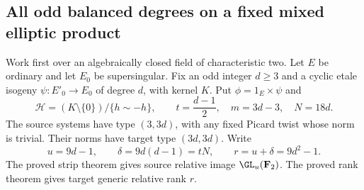 \subsection{All odd balanced degrees on a fixed mixed elliptic product}
\label{subsec:mixed-all-odd-norm-candidate}

Work first over an algebraically closed field of characteristic two.
Let $E$ be ordinary and let $E_0$ be supersingular. Fix an odd integer
$d\geq3$ and a cyclic etale isogeny
$\psi:E'_0\longrightarrow E_0$ of degree $d$, with kernel $K$.
Put $\phi=1_E\times\psi$ and
\[
 \mathcal H=(K\setminus\{0\})/\{h\sim-h\},\qquad
 t=\frac{d-1}{2},\quad m=3d-3,\quad N=18d.
\]
The source systems have type $(3,3d)$, with any fixed Picard twist
whose norm is trivial. Their norms have target type $(3d,3d)$.
Write
\[
 u=9d-1,\qquad \delta=9d(d-1)=tN,\qquad r=u+\delta=9d^2-1.
\]
The proved strip theorem gives source relative image $\GL_u(\mathbf F_2)$.
The proved rank theorem gives target generic relative rank $r$.

